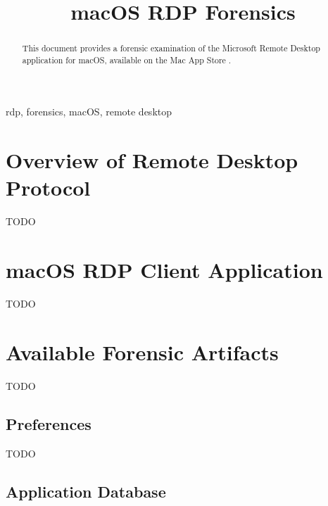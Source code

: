 \documentclass[conference]{IEEEtran}
\begin{document}
\title{macOS RDP Forensics}

\author{
}

\maketitle

\begin{abstract}
This document provides a forensic examination of the Microsoft Remote Desktop application for macOS, available on the Mac App Store \cite{mrdpapp}.
\end{abstract}

\begin{IEEEkeywords}
rdp, forensics, macOS, remote desktop
\end{IEEEkeywords}

\section{Overview of Remote Desktop Protocol}
TODO

\section{macOS RDP Client Application}


TODO

\section{Available Forensic Artifacts}

TODO

\subsection{Preferences}

TODO

\subsection{Application Database}
\end{document}
